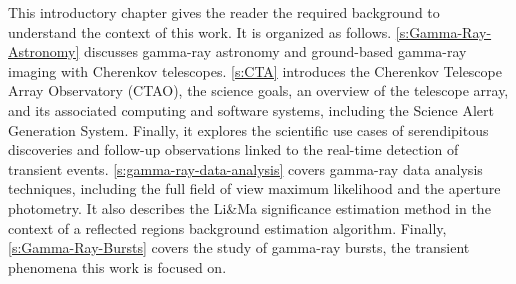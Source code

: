 \begin{chapabstract}
\small{
This introductory chapter gives the reader the required background to understand the context of this work. It is organized as follows.
\autoref{s:Gamma-Ray-Astronomy} discusses gamma-ray astronomy and ground-based gamma-ray imaging with Cherenkov telescopes. \autoref{s:CTA} introduces the Cherenkov Telescope Array Observatory (CTAO), the science goals, an overview of the telescope array, and its associated computing and software systems, including the Science Alert Generation System. Finally, it explores the scientific use cases of serendipitous discoveries and follow-up observations linked to the real-time detection of transient events. \autoref{s:gamma-ray-data-analysis} covers gamma-ray data analysis techniques, including the full field of view maximum likelihood and the aperture photometry. It also describes the Li\&Ma significance estimation method in the context of a reflected regions background estimation algorithm. Finally, \autoref{s:Gamma-Ray-Bursts} covers the study of gamma-ray bursts, the transient phenomena this work is focused on.
}\\
\begin{center}
\noindent\makebox[0.8\linewidth]{\rule{0.66\paperwidth}{0.4pt}}
\end{center}
\vspace{1cm}
\end{chapabstract}

